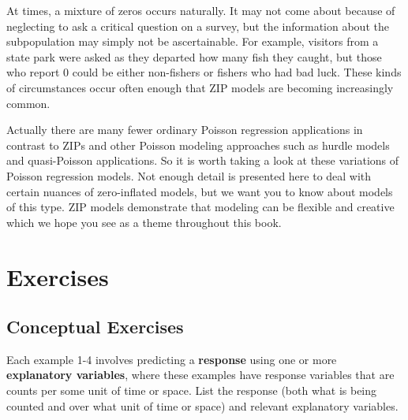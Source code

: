\documentclass[
]{krantz}
\begin{document}
At times, a mixture of zeros occurs naturally. It may not come about because of neglecting to ask a critical question on a survey, but the information about the subpopulation may simply not be ascertainable. For example, visitors from a state park were asked as they departed how many fish they caught, but those who report 0 could be either non-fishers or fishers who had bad luck. These kinds of circumstances occur often enough that ZIP models are becoming increasingly common.

Actually there are many fewer ordinary Poisson regression applications in contrast to ZIPs and other Poisson modeling approaches such as hurdle models and quasi-Poisson applications. So it is worth taking a look at these variations of Poisson regression models. Not enough detail is presented here to deal with certain nuances of zero-inflated models, but we want you to know about models of this type. ZIP models demonstrate that modeling can be flexible and creative which we hope you see as a theme throughout this book.

\hypertarget{exercises-3}{%
\section{Exercises}\label{exercises-3}}

\hypertarget{exer:concept}{%
\subsection{Conceptual Exercises}\label{exer:concept}}

Each example 1-4 involves predicting a \textbf{response} using one or more \textbf{explanatory variables}, where these examples have response variables that are counts per some unit of time or space. List the response (both what is being counted and over what unit of time or space) and relevant explanatory variables.
\end{document}

